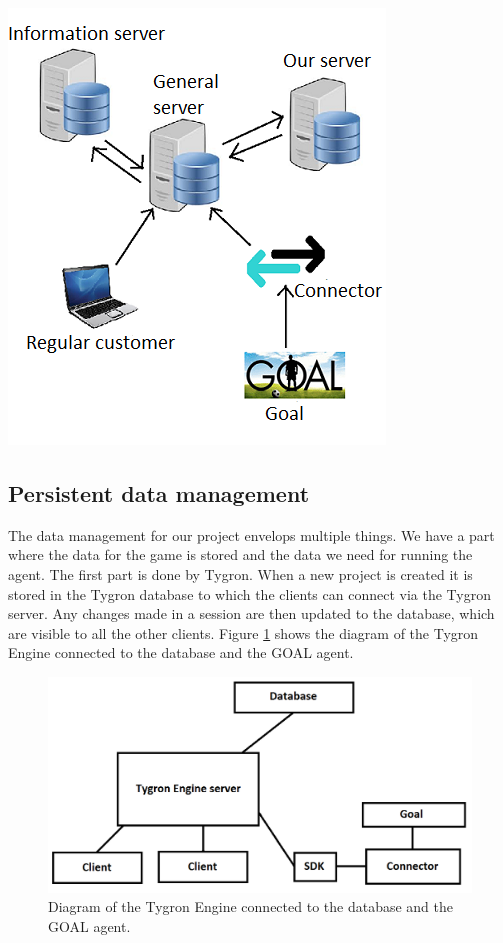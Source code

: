 \begin{center}
\includegraphics[scale=0.68]{Server_model.png}
\end{center}

\newpage
\subsection{Persistent data management}
The data management for our project envelops multiple things. We have a part where the data for the game is stored and the data we need for running the agent. The first part is done by Tygron. When a new project is created it is stored in the Tygron database to which the clients can connect via the Tygron server. Any changes made in a session are then updated to the database, which are visible to all the other clients. Figure \ref{fig:tygron1} shows the diagram of the Tygron Engine connected to the database and the GOAL agent.

\begin{figure}[h!]
  \includegraphics[width=\linewidth]{Tygrondatabase.png}
  \caption{Diagram of the Tygron Engine connected to the database and the GOAL agent.}
  \label{fig:tygron1}
\end{figure}

